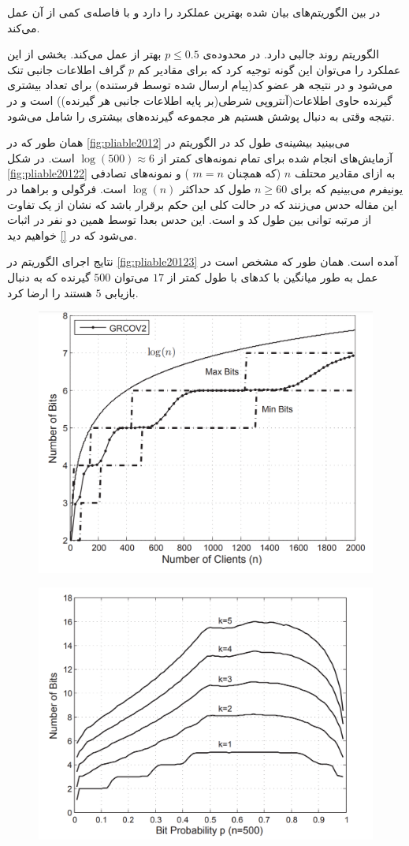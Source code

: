 در بین الگوریتم‌های بیان شده
بهترین عملکرد را دارد و
با فاصله‌ی کمی از آن عمل می‌کند.

الگوریتم
روند جالبی دارد. در محدوده‌ی 
$p \leq 0.5$
بهتر از
عمل می‌کند. بخشی از این عملکرد را می‌توان این گونه توجیه کرد که برای مقادیر کم
$p$
گراف اطلاعات جانبی تنک می‌شود و در نتیجه هر عضو کد(پیام ارسال شده توسط فرستنده)  برای تعداد بیشتری گیرنده حاوی اطلاعات(آنتروپی شرطی(بر پایه اطلاعات جانبی هر گیرنده)) است و در نتیجه وقتی به دنبال پوشش هستیم هر مجموعه گیرنده‌های بیشتری را شامل می‌شود.

همان طور که در
\autoref{fig:pliable2012}
می‌بینید بیشینه‌ی طول کد در الگوریتم
در آزمایش‌های انجام شده برای تمام نمونه‌های
\picod
کمتر از
$\log(500) \approx 6$
است. در شکل
\autoref{fig:pliable20122}
به ازای مقادیر محتلف 
$n$
(که همچنان
$m = n$
) و نمونه‌های تصادفی یونیفرم می‌بینیم که برای
$n \geq 60$
طول کد حداکثر
$\log(n)$
است. فرگولی و براهما در این مقاله حدس می‌زنند که در حالت کلی این حکم برقرار باشد که نشان از یک تفاوت از مرتبه توانی بین طول کد
\picod
و 
\icod
است. این حدس بعدا توسط همین دو نفر در
\cite{pliable2015paper}
اثبات می‌شود که در
\autoref{}
خواهیم دید. 

نتایج اجرای الگوریتم
در 
\autoref{fig:pliable20123}
آمده است. همان طور که مشخص است در عمل به طور میانگین با کدهای با طول کمتر از
$17$
می‌توان 
$500$
گیرنده که به دنبال بازیابی 
$5$
هستند را ارضا کرد.
\begin{figure}
	\centering
	\includegraphics[width=0.7\linewidth]{figs/ch3/pliable2012_2}
	\caption{\cite{pliablefirstpaper}}
	\label{fig:pliable20122}
\end{figure}
\begin{figure}
	\centering
	\includegraphics[width=0.7\linewidth]{figs/ch3/pliable2012_3}
	\caption{\cite{pliablefirstpaper}}
	\label{fig:pliable20123}
\end{figure}


